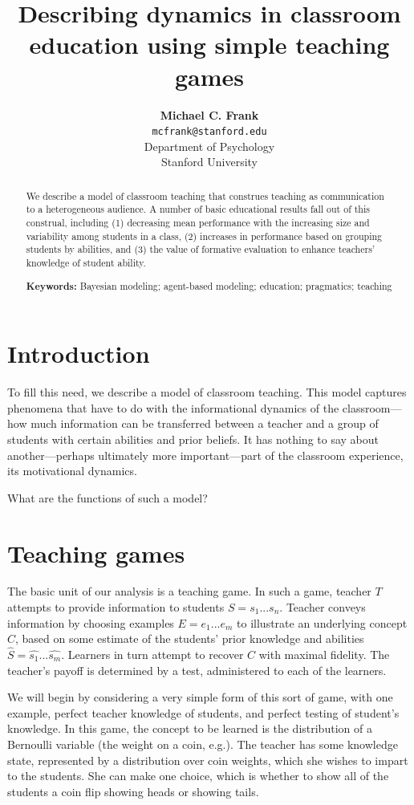 \documentclass[10pt,letterpaper]{article}
\title{Describing dynamics in classroom education using simple teaching games}
\author{{\large \bf Michael C. Frank} \\
  \texttt{mcfrank@stanford.edu} \\
  Department of Psychology\\
  Stanford University}
\begin{document}
\maketitle

\begin{abstract}
We describe a model of classroom teaching that construes teaching as communication to a heterogeneous audience. A number of basic educational results fall out of this construal, including (1) decreasing mean performance with the increasing size and variability among students in a class, (2) increases in performance based on grouping students by abilities, and (3) the value of formative evaluation to enhance teachers' knowledge of student ability.

\textbf{Keywords:} 
Bayesian modeling; agent-based modeling; education; pragmatics; teaching
\end{abstract}

\section{Introduction}

To fill this need, we describe a model of classroom teaching. This model captures phenomena that have to do with the informational dynamics of the classroom---how much information can be transferred between a teacher and a group of students with certain abilities and prior beliefs. It has nothing to say about another---perhaps ultimately more important---part of the classroom experience, its motivational dynamics.  

What are the functions of such a model? 

\section{Teaching games}

The basic unit of our analysis is a teaching game. In such a game, teacher $T$ attempts to provide information to students $S = {s_1 ... s_n}$. Teacher conveys information by choosing examples $E = {e_1 ... e_m}$ to illustrate an underlying concept $C$, based on some estimate of the students' prior knowledge and abilities $\hat{S} = {\hat{s_1} ... \hat{s_m}}$. Learners in turn attempt to recover $C$ with maximal fidelity. The teacher's payoff is determined by a test, administered to each of the learners. 

We will begin by considering a very simple form of this sort of game, with one example, perfect teacher knowledge of students, and perfect testing of student's knowledge. In this game, the concept to be learned is the distribution of a Bernoulli variable (the weight on a coin, e.g.). The teacher has some knowledge state, represented by a distribution over coin weights, which she wishes to impart to the students. She can make one choice, which is whether to show all of the students a coin flip showing heads or showing tails.
\end{document}
